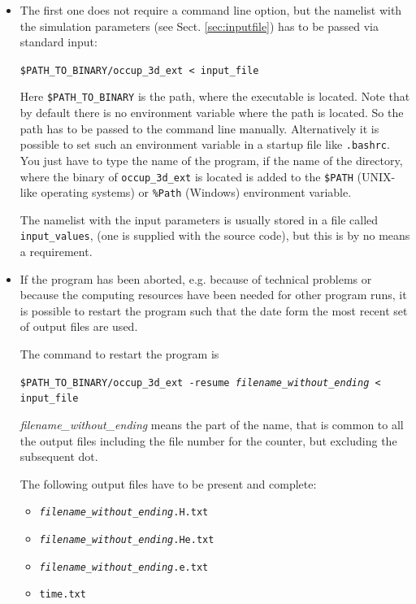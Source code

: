 \documentclass[a4paper,10pt]{article}
\begin{document}
\begin{itemize}
\item The first one does not require a
command line option, but the namelist with the simulation parameters (see Sect. 
\ref{sec:inputfile}) has to be passed via standard input:

\texttt{\$PATH\_TO\_BINARY/occup\_3d\_ext < input\_file}

Here \texttt{\$PATH\_TO\_BINARY} is the path, where the executable is located.  
Note that by default there is no  environment variable where the path is 
located. So the  path has to be passed to the command line manually. 
Alternatively it is possible to set such an environment variable in a 
startup file like \texttt{.bashrc}. You just have to type the name of the program, 
if the name of the directory, where the binary of \texttt{occup\_3d\_ext} is 
located is added to the \texttt{\$PATH} (UNIX-like operating systems) or 
\texttt{\%Path} (Windows) environment variable. 

The namelist with the input parameters is usually stored in a file  called 
\texttt{input\_values}, (one is supplied with the source code), but this is by 
no means a requirement.

\item If the program has been aborted, e.g. because of technical problems or  
because the computing resources have been needed for other program runs, it is 
possible to restart the program such that the date form the most recent set of 
output files are used.

The command to restart the program is

\texttt{\$PATH\_TO\_BINARY/occup\_3d\_ext -resume \textit{filename\_without\_ending} < input\_file}

\textit{filename\_without\_ending} means the part of the name, that is common to 
all the output files including the file number for the counter, but excluding 
the subsequent dot.

The following output files have to be present and complete:
\begin{itemize}
\item \texttt{\textit{filename\_without\_ending}.H.txt}
\item \texttt{\textit{filename\_without\_ending}.He.txt}
\item \texttt{\textit{filename\_without\_ending}.e.txt}
\item \texttt{time.txt}
\end{itemize}


\end{itemize}
\end{document}

